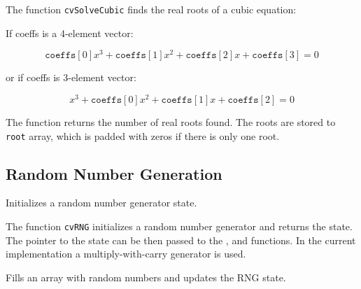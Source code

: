 The function \texttt{cvSolveCubic} finds the real roots of a cubic equation:

If coeffs is a 4-element vector:

\[
\texttt{coeffs}[0] x^3 + \texttt{coeffs}[1] x^2 + \texttt{coeffs}[2] x + \texttt{coeffs}[3] = 0
\]

or if coeffs is 3-element vector:

\[
x^3 + \texttt{coeffs}[0] x^2 + \texttt{coeffs}[1] x + \texttt{coeffs}[2] = 0
\]

The function returns the number of real roots found. The roots are
stored to \texttt{root} array, which is padded with zeros if there is
only one root.

\subsection{Random Number Generation}

\label{RNG}

Initializes a random number generator state.


\begin{description}
\end{description}


The function \texttt{cvRNG} initializes a random number generator
and returns the state. The pointer to the state can be then passed to the
,  and  functions. In the
current implementation a multiply-with-carry generator is used.

\label{RandArr}

Fills an array with random numbers and updates the RNG state.


